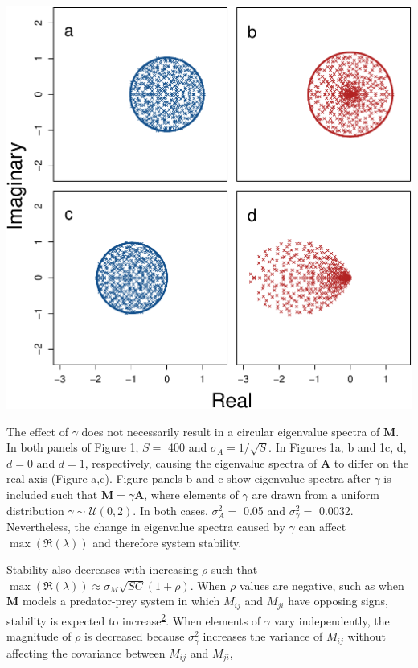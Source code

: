 \documentclass[]{article}
\begin{document}
\includegraphics{revision_notes_files/figure-latex/unnamed-chunk-2-1.pdf}

The effect of \(\gamma\) does not necessarily result in a circular
eigenvalue spectra of \(\textbf{M}\). In both panels of Figure 1,
\(S =\) 400 and \(\sigma_{A} = 1/\sqrt{S}\). In Figures 1a, b and 1c, d,
\(d = 0\) and \(d = 1\), respectively, causing the eigenvalue spectra of
\(\textbf{A}\) to differ on the real axis (Figure a,c). Figure panels b
and c show eigenvalue spectra after \(\gamma\) is included such that
\(\textbf{M} = \gamma \textbf{A}\), where elements of \(\gamma\) are
drawn from a uniform distribution \(\gamma \sim \mathcal{U}(0, 2)\). In
both cases, \(\sigma^{2}_{A} =\) 0.05 and \(\sigma^{2}_{\gamma} =\)
0.0032. Nevertheless, the change in eigenvalue spectra caused by
\(\gamma\) can affect \(\max(\Re(\lambda))\) and therefore system
stability.

Stability also decreases with increasing \(\rho\) such that
\(\max(\Re(\lambda)) \approx \sigma_{M}\sqrt{SC}\left(1 + \rho\right)\).
When \(\rho\) values are negative, such as when \(\textbf{M}\) models a
predator-prey system in which \(M_{ij}\) and \(M_{ji}\) have opposing
signs, stability is expected to
increase\textsuperscript{\protect\hyperlink{ref-Allesina2012}{2}}. When
elements of \(\gamma\) vary independently, the magnitude of \(\rho\) is
decreased because \(\sigma^{2}_{\gamma}\) increases the variance of
\(M_{ij}\) without affecting the covariance between \(M_{ij}\) and
\(M_{ji}\),
\end{document}
